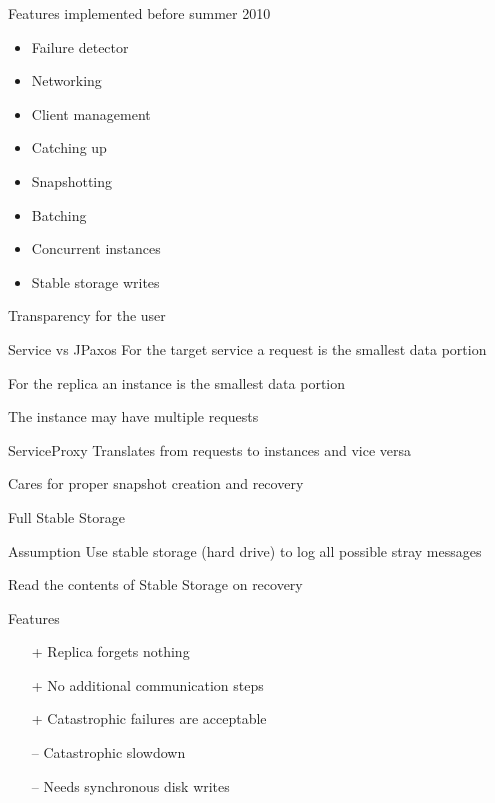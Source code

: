 \documentclass[hyperref={pdfpagelabels=true},11pt,compress,trans]{beamer}
\begin{document}
\begin{frame}{Features implemented before summer 2010}
 \begin{block}{}
    \vspace{-1em}\vspace{-\parskip}\vspace{-\lineskip}
    \begin{itemize}
      \item Failure detector
      \item Networking
      \item Client management
      \item Catching up
      \item Snapshotting
      \item Batching
      \item Concurrent instances
      \item Stable storage writes
    \end{itemize}
  \end{block}
\end{frame}

\begin{frame}{Transparency for the user}
 \begin{block}{Service vs JPaxos}
  For the target service a request is the smallest data portion
  
  For the replica an instance is the smallest data portion
  
  The instance may have multiple requests
 \end{block}

 \begin{block}{ServiceProxy}
  Translates from requests to instances and vice versa
  
  Cares for proper snapshot creation and recovery
 \end{block}
\end{frame}

\begin{frame}{Full Stable Storage}
 \begin{block}{Assumption}
  Use stable storage (hard drive) to log all possible stray messages
  
  Read the contents of Stable Storage on recovery
 \end{block}

 \begin{block}{Features}
  \vspace{-1em}\vspace{-\parskip}\vspace{-\lineskip}
  \begin{itemize}
   \item[+]  Replica forgets nothing
   \item[+]  No additional communication steps
   \item[+]  Catastrophic failures are acceptable
   \item[--] Catastrophic slowdown
   \item[--] Needs synchronous disk writes
  \end{itemize}
 \end{block}
\end{frame}
\end{document}
